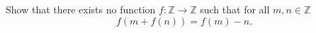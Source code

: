Show that there exists no function $f:\mathbb{Z}\to\mathbb{Z}$ such that for all $m,n \in \mathbb{Z}$
$$f(m+f(n))=f(m)-n.$$
